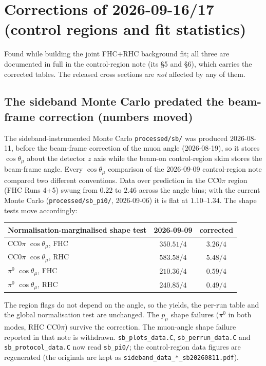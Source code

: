 \section{Corrections of 2026-09-16/17 (control regions and fit statistics)}

Found while building the joint FHC$+$RHC background fit; all three are documented in full in the
control-region note (its \S5 and \S6), which carries the corrected tables. The released cross
sections are \emph{not} affected by any of them.

\subsection{The sideband Monte Carlo predated the beam-frame correction (numbers moved)}
The sideband-instrumented Monte Carlo \texttt{processed/sb/} was produced 2026-08-11, before the
beam-frame correction of the muon angle (2026-08-19), so it stores $\cos\theta_\mu$ about the
detector $z$ axis while the beam-on control-region skim stores the beam-frame angle. Every
$\cos\theta_\mu$ comparison of the 2026-09-09 control-region note compared two different
conventions. Data over prediction in the CC$0\pi$ region (FHC Runs 4+5) swung from $0.22$ to $2.46$
across the angle bins; with the current Monte Carlo (\texttt{processed/sb\_pi0/}, 2026-09-06) it is
flat at $1.10$--$1.34$. The shape tests move accordingly:

\begin{center}\small
\begin{tabular}{lcc}
\toprule
Normalisation-marginalised shape test & 2026-09-09 & corrected \\
\midrule
CC$0\pi$ $\cos\theta_\mu$, FHC & $350.51/4$ & $3.26/4$ \\
CC$0\pi$ $\cos\theta_\mu$, RHC & $583.58/4$ & $5.48/4$ \\
$\pi^0$ $\cos\theta_\mu$, FHC & $210.36/4$ & $0.59/4$ \\
$\pi^0$ $\cos\theta_\mu$, RHC & $240.85/4$ & $0.49/4$ \\
\bottomrule
\end{tabular}
\end{center}

\noindent The region flags do not depend on the angle, so the yields, the per-run table and the
global normalisation test are unchanged. The $p_\mu$ shape failures ($\pi^0$ in both modes, RHC
CC$0\pi$) survive the correction. The muon-angle shape failure reported in that note is withdrawn.
\texttt{sb\_plots\_data.C}, \texttt{sb\_perrun\_data.C} and \texttt{sb\_protocol\_data.C} now read
\texttt{sb\_pi0/}; the control-region data figures are regenerated (the originals are kept as
\texttt{sideband\_data\_*\_sb20260811.pdf}).

